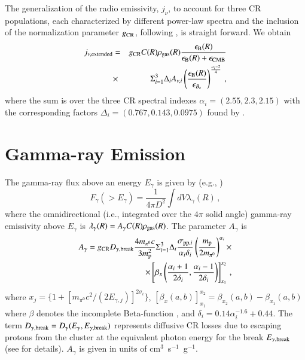 \documentclass[useAMS,usenatbib]{mn2e}
\begin{document}
\begin{appendix}
The generalization of the radio emissivity, $j_{\nu}$, to account for three CR populations,
each characterized by different power-law spectra and the inclusion of the
normalization parameter $g_{{\mathrm{CR}}}$, following \cite{2010MNRAS.409..449P}, is
straight forward. We obtain
%
\begin{eqnarray}
j_{\nu,{\mathrm{extended}}} & = &g_{{\mathrm{CR}}} C(R) \rho_{{\mathrm{gas}}}(R) \frac{\epsilon_{{\mathrm{B}}}(R)}{\epsilon_{{\mathrm{B}}}(R)+\epsilon_{{\mathrm{CMB}}}} \nonumber \\
& \times & \Sigma_{i=1}^{3} \Delta_{i} A_{\nu,i} \left( \frac{\epsilon_{{\mathrm{B}}}(R)}{\epsilon_{B_{{\mathrm{c}}}}} \right)^{\frac{\alpha_{i}-2}{4}}  \, ,
\end{eqnarray}
%
where the sum is over the three CR spectral indexes $\alpha_{i}=(2.55,2.3,2.15)$
with the corresponding factors $\Delta_{i} = (0.767, 0.143, 0.0975)$ found by
\cite{2010MNRAS.409..449P}.
 


\section{Gamma-ray Emission}
\label{app:C}

The gamma-ray flux above an energy $E_{\gamma}$ is given by (e.g.,
\citealp{2010MNRAS.409..449P})
%
\begin{equation}
F_{\gamma} (>E_{\gamma}) = \frac{1}{4\pi D^{2}} \int dV  \lambda_{\gamma}(R)\, ,
\end{equation}
%
where the omnidirectional (i.e., integrated over the $4\pi$ solid angle)
gamma-ray emissivity above $E_{\gamma}$ is $ \lambda_{\gamma}(R)=A_{\gamma} C(R)
\rho_{{\mathrm{gas}}}(R)$. The parameter $A_{\gamma}$ is \citep{2010MNRAS.409..449P}
%
\begin{eqnarray}
A_{\gamma} = g_{{\mathrm{CR}}} D_{\gamma,{\mathrm{break}}} \frac{4 m_{\pi^{0}} c}{3 m_{{\mathrm{p}}}^{2}} \Sigma_{i=1}^{3} \Delta_{i} \frac{\sigma_{{\mathrm{pp}},i}}{\alpha_{i} \delta_{i}} \left( \frac{m_{{\mathrm{p}}}}{2 m_{\pi^{0}}} \right)^{\alpha_{i}} \times \nonumber \\
\times \left[ \beta_{x} \left( \frac{\alpha_{i}+1}{2\delta_{i}}, \frac{\alpha_{i}-1}{2\delta_{i}} \right) \right]_{x_{1}}^{x_{2}} \, ,
\end{eqnarray}
%
where $x_{j}=\{ 1 + [ m_{\pi^{0}}c^2/(2E_{\gamma,j})]^{2\sigma_{i}} \}$, $\left[ \beta_{x}(a,b) \right]_{x_1}^{x_2} =
\beta_{x_2}(a,b)-\beta_{x_1}(a,b)$ where $\beta$ denotes the incomplete
Beta-function \citep{1965hmfw.book.....A}, and
$\delta_{i}=0.14\alpha_{i}^{-1.6}+0.44$. The term $D_{\gamma,
  {\mathrm{break}}}=D_{\gamma}(E_{\gamma},E_{\gamma,{\mathrm{break}}})$ represents
diffusive CR losses due to escaping protons from the cluster at the equivalent
photon energy for the break $E_{\gamma, {\mathrm{break}}}$ (see
\citealp{2010MNRAS.409..449P} for details). $A_{\gamma}$ is given in units of
cm$^3$~s$^{-1}$~g$^{-1}$.




\end{appendix}
\end{document}
